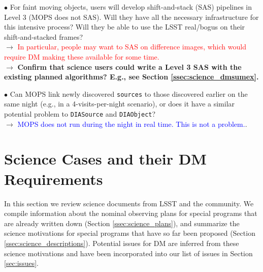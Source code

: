 \documentclass[DM,lsstdraft,toc]{lsstdoc}
\begin{document}
$\bullet$ For faint moving objects, users will develop shift-and-stack (SAS) pipelines in Level 3 (MOPS does not SAS). Will they have all the necessary infrastructure for this intensive process? Will they be able to use the LSST real/bogus on their shift-and-stacked frames? \\
$\rightarrow$ \textcolor{red}{In particular, people may want to SAS on difference images, which would require DM making these available for some time.} \\
$\rightarrow$ \textbf{Confirm that science users could write a Level 3 SAS with the existing planned algorithms? E.g., see Section \ref{ssec:science_dmsumex}.}

$\bullet$ Can MOPS link newly discovered {\tt sources} to those discovered earlier on the same night (e.g., in a 4-visits-per-night scenario), or does it have a similar potential problem to {\tt DIASource} and {\tt DIAObject}? \\
$\rightarrow$  \textcolor{blue}{MOPS does not run during the night in real time. This is not a problem.}.


\clearpage
\section{Science Cases and their DM Requirements} \label{sec:science}

In this section we review science documents from LSST and the community. We compile information about the nominal observing plans for special programs that are already written down (Section \ref{ssec:science_plans}), and summarize the science motivations for special programs that have so far been proposed (Section \ref{ssec:science_descriptions}). Potential issues for DM are inferred from these science motivations and have been incorporated into our list of issues in Section \ref{sec:issues}.
\end{document}
